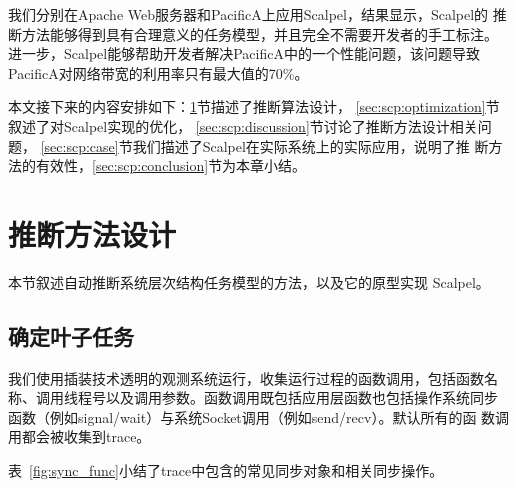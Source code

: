 我们分别在Apache Web服务器和PacificA上应用Scalpel，结果显示，Scalpel的
推断方法能够得到具有合理意义的任务模型，并且完全不需要开发者的手工标注。
进一步，Scalpel能够帮助开发者解决PacificA中的一个性能问题，该问题导致
PacificA对网络带宽的利用率只有最大值的70\%。

本文接下来的内容安排如下：\ref{sec:scp:design}节描述了推断算法设计，
\ref{sec:scp:optimization}节叙述了对Scalpel实现的优化，
\ref{sec:scp:discussion}节讨论了推断方法设计相关问题，
\ref{sec:scp:case}节我们描述了Scalpel在实际系统上的实际应用，说明了推
断方法的有效性，\ref{sec:scp:conclusion}节为本章小结。

\section{推断方法设计}
\label{sec:scp:design}

本节叙述自动推断系统层次结构任务模型的方法，以及它的原型实现
\pozhehao{}Scalpel。



\subsection{确定叶子任务}

我们使用插装技术透明的观测系统运行，收集运行过程的函数调用，包括函数名
称、调用线程号以及调用参数。函数调用既包括应用层函数也包括操作系统同步
函数（例如signal/wait）与系统Socket调用（例如send/recv）。默认所有的函
数调用都会被收集到trace。

表~\ref{fig:sync_func}小结了trace中包含的常见同步对象和相关同步操作。

